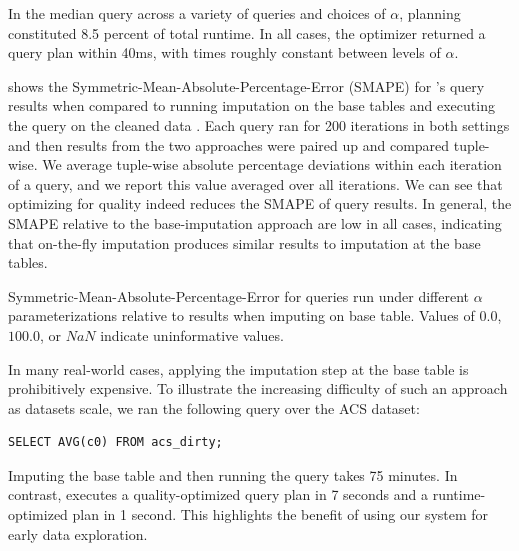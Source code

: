 
In the median query across a variety of queries and choices of $\alpha$, planning
constituted 8.5 percent of total runtime. In all cases, the optimizer
returned a query plan within 40ms, with times roughly constant between levels of $\alpha$.



 shows the Symmetric-Mean-Absolute-Percentage-Error (SMAPE) for \ProjectName{}'s query results when compared to running imputation on the base tables and executing the query on the cleaned data .
Each query ran for 200 iterations  in both settings and then results from the two approaches were paired up and compared tuple-wise.
We average tuple-wise absolute percentage deviations within each iteration of a query, and we report this value averaged over all iterations.
We can see that optimizing for quality indeed reduces the SMAPE of query results.
In general, the SMAPE relative to the base-imputation approach are low in all cases, indicating that on-the-fly imputation produces similar results to imputation at the base tables.

\begin{table}
\centering

\caption{Symmetric-Mean-Absolute-Percentage-Error for queries run under different $\alpha$
    parameterizations relative to results when imputing on base table. Values of $0.0$,
    $100.0$, or $NaN$ indicate uninformative values.} %
\label{table:smape}
\end{table}

In many real-world cases, applying the imputation step at the base table is prohibitively expensive.
To illustrate the increasing difficulty of such an approach as datasets scale, we ran the following query over the ACS dataset:
\begin{lstlisting}
SELECT AVG(c0) FROM acs_dirty;
\end{lstlisting}
Imputing the base table and then running the query takes 75 minutes.
In contrast, \ProjectName{} executes a quality-optimized query plan in 7 seconds and a runtime-optimized plan in 1 second.
This highlights the benefit of using our system for early data exploration.


